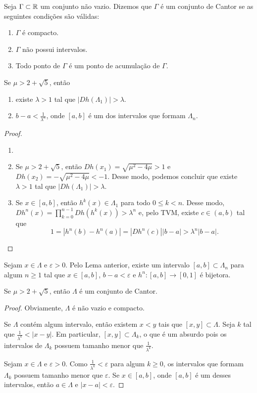 \begin{definition}
Seja $\Gamma \subset \mathbb{R}$ um conjunto não vazio. Dizemos que $\Gamma$ é um conjunto de Cantor se as seguintes condições são válidas:
\begin{enumerate}[label=\roman*.]
\item $\Gamma$ é compacto.
\item $\Gamma$ não possui intervalos.
\item Todo ponto de $\Gamma$ é um ponto de acumulação de $\Gamma$.
\end{enumerate}
\end{definition}

\begin{lemma}
Se $\mu > 2 + \sqrt{5}$, então
\begin{enumerate}
\item  existe $\lambda > 1$ tal que $|D h(\Lambda_1)| > \lambda$.
\item $b - a < \frac{1}{\lambda^n}$, onde $[a, b]$ é um dos intervalos que formam $\Lambda_n$.
\end{enumerate}
\end{lemma}

\begin{proof}
\begin{enumerate}\item[]
\item Se $\mu > 2 + \sqrt{5}$, então $D h(x_1) = \sqrt{\mu^2 - 4\mu} > 1$ e $D h(x_2) = -\sqrt{\mu^2 - 4\mu} < -1$.
Desse modo, podemos concluir que existe $\lambda > 1$ tal que $|D h(\Lambda_1)| > \lambda$.
\item Se $x \in [a, b]$, então $h^k(x) \in \Lambda_1$ para todo $0 \leq k < n$.
Desse modo, $D h^n(x) = \prod_{k=0}^{n-1} D h(h^k(x)) > \lambda^n$ e, pelo TVM, existe $c \in (a, b)$ tal que
$$1 = |h^n(b) - h^n(a)| = |D h^n(c)||b - a| > \lambda^n|b - a|.$$
\end{enumerate}
\end{proof} 

Sejam $x \in \Lambda$ e $\varepsilon > 0$. Pelo Lema anterior,  existe um intervalo $[a, b] \subset \Lambda_n$ para algum $n \geq 1$ tal que $x \in [a, b]$, $b - a < \varepsilon$ e $h^n: [a, b] \to [0,1]$ é bijetora.

\begin{theorem}
Se $\mu > 2 + \sqrt{5}$, então $\Lambda$ é um conjunto de Cantor.
\end{theorem}

\begin{proof}
Obviamente, $\Lambda$ é não vazio e compacto.

Se $\Lambda$ contém algum intervalo, então existem $x < y$ tais que $[x, y] \subset \Lambda$.
Seja $k$ tal que $\frac{1}{\lambda^k} < |x - y|$.
Em particular, $[x, y] \subset \Lambda_k$, o que é um absurdo pois os intervalos de $\Lambda_k$ possuem tamanho menor que $\frac{1}{\lambda^k}$.

Sejam $x \in \Lambda$ e $\varepsilon > 0$.
Como $\frac{1}{\lambda^k} < \varepsilon$ para algum $k \geq 0$, os intervalos que formam $\Lambda_k$ possuem tamanho menor que $\varepsilon$.
Se $x \in [a, b]$, onde $[a, b]$ é um desses intervalos, então $a \in \Lambda$ e $|x - a| < \varepsilon$.
\end{proof}
